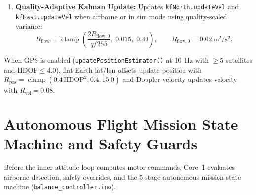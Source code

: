 \documentclass[11pt,a4paper]{article}
\begin{document}
\begin{enumerate}
  \item \textbf{Quality-Adaptive Kalman Update:} Updates \texttt{kfNorth.updateVel} and \texttt{kfEast.updateVel} when airborne or in sim mode using quality-scaled variance:
  \begin{equation}
    R_{\text{flow}} = \operatorname{clamp}\!\left(\frac{2 R_{\text{flow},0}}{q / 255},\; 0.015,\; 0.40\right), \qquad R_{\text{flow},0} = 0.02\,\text{m}^2/\text{s}^2.
  \end{equation}
\end{enumerate}

When GPS is enabled (\texttt{updatePositionEstimator()} at 10~Hz with $\ge 5$ satellites and $\text{HDOP} \le 4.0$), flat-Earth lat/lon offsets update position with $R_{\text{pos}} = \operatorname{clamp}(0.4\,\text{HDOP}^2, 0.4, 15.0)$ and Doppler velocity updates velocity with $R_{\text{vel}} = 0.08$.

\section{Autonomous Flight Mission State Machine and Safety Guards}

Before the inner attitude loop computes motor commands, Core~1 evaluates airborne detection, safety overrides, and the 5-stage autonomous mission state machine (\texttt{balance\_controller.ino}).
\end{document}
